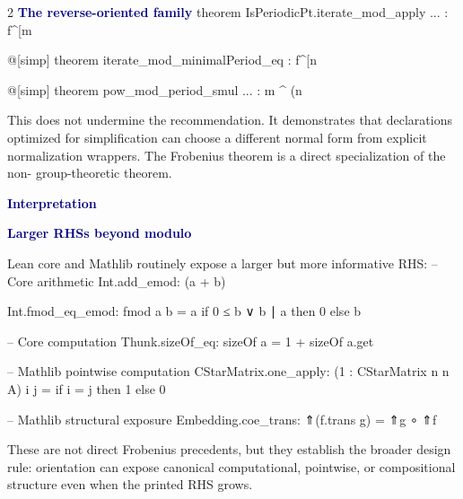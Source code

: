\documentclass[10pt]{article}
\newenvironment{leansmall}{\Verbatim[fontsize=\scriptsize,frame=single,framesep=1.5mm,rulecolor=\color{blue!35},formatcom=\leanfont]}{\endVerbatim}
\newcommand{\code}[1]{{\leanfont #1}}
\newcommand{\decision}[1]{\textcolor{navy}{\bfseries #1}}
\begin{document}
\begin{multicols}{2}
\decision{The reverse-oriented family}
\begin{leansmall}
theorem IsPeriodicPt.iterate_mod_apply ... :
  f^[m %

@[simp] theorem iterate_mod_minimalPeriod_eq :
  f^[n %

@[simp] theorem pow_mod_period_smul ... :
  m ^ (n %
\end{leansmall}

This does not undermine the recommendation.  It demonstrates that declarations optimized for simplification can choose a different normal form from explicit normalization wrappers.  The Frobenius theorem is a direct specialization of the non-\code{[simp]} group-theoretic theorem.

\decision{Interpretation}
\begin{center}
\end{center}

\columnbreak
\decision{Larger RHSs beyond modulo}

Lean core and Mathlib routinely expose a larger but more informative RHS:
\begin{leansmall}
-- Core arithmetic
Int.add_emod:
  (a + b) %

Int.fmod_eq_emod:
  fmod a b = a %
    if 0 ≤ b ∨ b ∣ a then 0 else b

-- Core computation
Thunk.sizeOf_eq:
  sizeOf a = 1 + sizeOf a.get

-- Mathlib pointwise computation
CStarMatrix.one_apply:
  (1 : CStarMatrix n n A) i j =
    if i = j then 1 else 0

-- Mathlib structural exposure
Embedding.coe_trans:
  ⇑(f.trans g) = ⇑g ∘ ⇑f
\end{leansmall}

These are not direct Frobenius precedents, but they establish the broader design rule: orientation can expose canonical computational, pointwise, or compositional structure even when the printed RHS grows.
\end{multicols}

\vspace{3mm}
\end{document}
